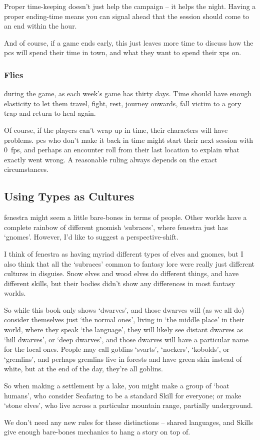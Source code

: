 \begin{multicols}{2}
Proper time-keeping doesn't just help the \gls{campaign} -- it helps the night.
Having a proper ending-time means you can signal ahead that the session should come to an end within the hour.

And of course, if a game ends early, this just leaves more time to discuss how the \glspl{pc} will spend their time in town, and what they want to spend their \glspl{xp} on.

\subsubsection{ Flies}
during the game, as each week's game has thirty days.
Time should have enough elasticity to let them travel, fight, rest, journey onwards, fall victim to a gory trap and return to heal again.

Of course, if the players can't wrap up in time, their characters will have problems.
\Glspl{pc} who don't make it back in time might start their next session with 0~\glspl{fp}, and perhaps an encounter roll from their last location to explain what exactly went wrong.
A reasonable ruling always depends on the exact circumstances.

\subsection{Using Types as Cultures}

\Gls{fenestra} might seem a little bare-bones in terms of people.
Other worlds have a complete rainbow of different gnomish `subraces', where \gls{fenestra} just has `gnomes'.
However, I'd like to suggest a perspective-shift.

I think of \gls{fenestra} as having myriad different types of elves and gnomes, but I also think that all the `subraces' common to fantasy lore were really just different cultures in disguise.
Snow elves and wood elves do different things, and have different skills, but their bodies didn't show any differences in most fantasy worlds.

So while this book only shows `dwarves', and those dwarves will (as we all do) consider themselves just `the normal ones', living in `the middle place' in their world, where they speak `the language', they will likely see distant dwarves as `hill dwarves', or `deep dwarves', and those dwarves will have a particular name for the local ones.
People may call goblins `svarts', `nockers', `kobolds', or `gremlins', and perhaps gremlins live in forests and have green skin instead of white, but at the end of the day, they're all goblins.

So when making a settlement by a lake, you might make a group of `boat humans', who consider Seafaring to be a standard Skill for everyone; or make `stone elves', who live across a particular mountain range, partially underground.

We don't need any new rules for these distinctions -- shared languages, and Skills give enough bare-bones mechanics to hang a story on top of.

\end{multicols}

